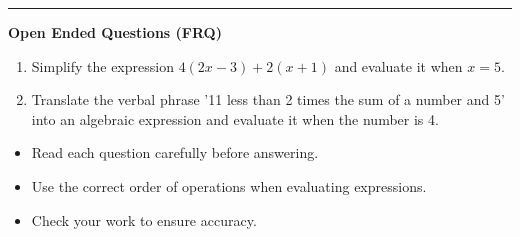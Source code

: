 \documentclass[10pt]{article}
\begin{document}
\vspace{-0.2cm}
\hrule
\vspace{0.2cm}
\textbf{\small Open Ended Questions (FRQ)}
\begin{enumerate}[label=\textbf{Q\arabic*.}, start=9, itemsep=5pt, topsep=0pt]

  \item \small Simplify the expression $4(2x - 3) + 2(x + 1)$ and evaluate it when $x = 5$. \vspace{2cm}

  \item \small Translate the verbal phrase '11 less than 2 times the sum of a number and 5' into an algebraic expression and evaluate it when the number is 4. \vspace{2cm}

\end{enumerate}

\vfill

\begin{tcolorbox}[colback=blue!5, colframe=mainblue!50, title=\small \textbf{Chef's Tips}, fonttitle=\bfseries, bottom=1mm]
\begin{itemize}[noitemsep, topsep=2pt, leftmargin=0.5cm]
  \item \scriptsize Read each question carefully before answering.\item \scriptsize Use the correct order of operations when evaluating expressions.\item \scriptsize Check your work to ensure accuracy.
\end{itemize}
\end{tcolorbox}
\end{document}
